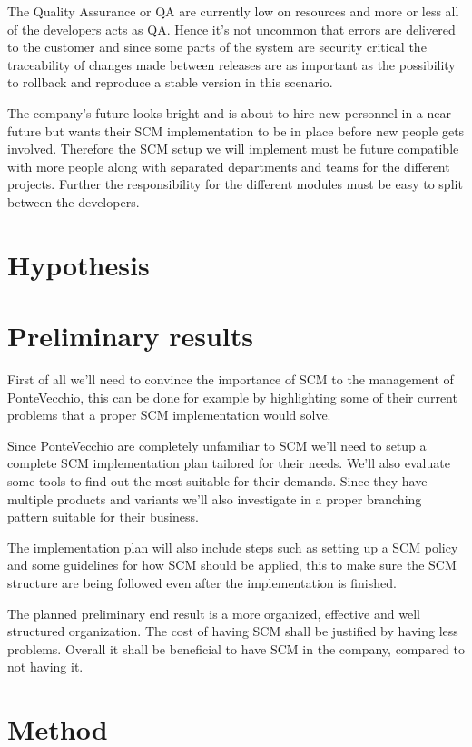 \documentclass[10pt]{article}
\begin{document}
\noindent The Quality Assurance or QA are currently low on resources and more or less all of the developers acts as QA. Hence it’s not uncommon that errors are delivered to the customer and since some parts of the system are security critical the traceability of changes made between releases are as important as the possibility to rollback and reproduce a stable version in this scenario.

\noindent The company's future looks bright and is about to hire new personnel in a near future but wants their SCM implementation to be in place before new people gets involved. Therefore the SCM setup we will implement must be future compatible with more people along with separated departments and teams for the different projects. Further the responsibility for the different modules must be easy to split between the developers.

\section{Hypothesis}

\section{Preliminary results}
First of all we’ll need to convince the importance of SCM to the management of PonteVecchio, this can be done for example by highlighting some of their current problems that a proper SCM implementation would solve.

\noindent Since PonteVecchio are completely unfamiliar to SCM we’ll need to setup a complete SCM implementation plan tailored for their needs. We’ll also evaluate some tools to find out the most suitable for their demands. 
Since they have multiple products and variants we’ll also investigate in a proper branching pattern suitable for their business.

\noindent The implementation plan will also include steps such as setting up a SCM policy and some guidelines for how SCM should be applied, this to make sure the SCM structure are being followed even after the implementation is finished.

\noindent The planned preliminary end result is a more organized, effective and well structured organization. The cost of having SCM shall be justified by having less problems. Overall it shall be beneficial to have SCM in the company, compared to not having it.

\section{Method}
\end{document}
